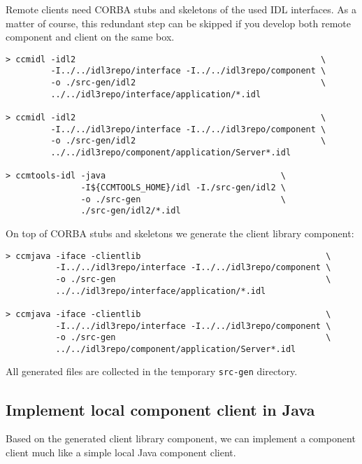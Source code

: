 \vspace{3mm}
Remote clients need CORBA stubs and skeletons of the used IDL interfaces.
As a matter of course, this redundant step can be skipped if you develop both
remote component and client on the same box.
\begin{footnotesize}
\begin{verbatim}
> ccmidl -idl2                                                 \
         -I../../idl3repo/interface -I../../idl3repo/component \ 
         -o ./src-gen/idl2                                     \
         ../../idl3repo/interface/application/*.idl

> ccmidl -idl2                                                 \ 
         -I../../idl3repo/interface -I../../idl3repo/component \
         -o ./src-gen/idl2                                     \
         ../../idl3repo/component/application/Server*.idl

> ccmtools-idl -java                                   \
               -I${CCMTOOLS_HOME}/idl -I./src-gen/idl2 \ 
               -o ./src-gen                            \
               ./src-gen/idl2/*.idl
\end{verbatim}
\end{footnotesize}

On top of CORBA stubs and skeletons we generate the client library component:
\begin{footnotesize}
\begin{verbatim}
> ccmjava -iface -clientlib                                     \
          -I../../idl3repo/interface -I../../idl3repo/component \
          -o ./src-gen                                          \
          ../../idl3repo/interface/application/*.idl

> ccmjava -iface -clientlib                                     \
          -I../../idl3repo/interface -I../../idl3repo/component \
          -o ./src-gen                                          \
          ../../idl3repo/component/application/Server*.idl
\end{verbatim}
\end{footnotesize}

All generated files are collected in the temporary {\tt src-gen} directory.



\subsection{Implement local component client in Java}
\label{subsection:ImplementRemoteComponentClientInJava}
Based on the generated client library component, we can implement a
component client much like a simple local Java component client.


